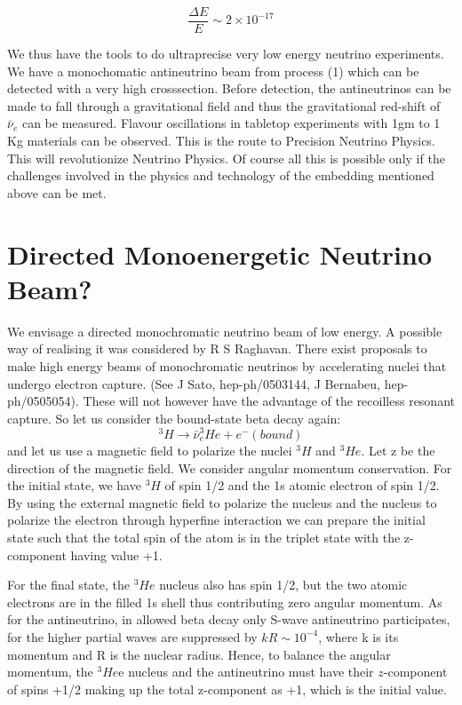 \begin{equation}
\frac{\Delta E}{E} \sim 2 \times 10^{-17}\label{eq-3}
\end{equation}


We thus have the tools to do ultraprecise very low energy neutrino experiments. We have
a monochomatic antineutrino beam from process (1) which can be detected with a very high
crosssection. Before detection, the antineutrinos can be made to fall through a gravitational
field and thus the gravitational red-shift of  $\bar{\nu}_{e}$ can be measured. Flavour oscillations in tabletop experiments with 1gm to 1 Kg materials can be observed. This is the route to Precision
Neutrino Physics. This will revolutionize Neutrino Physics. Of course all this is possible
only if the challenges involved in the physics and technology of the embedding mentioned
above can be met.

\section*{Directed Monoenergetic Neutrino Beam?}

We envisage a directed monochromatic neutrino beam of low energy. A possible way of
realising it was considered by R S Raghavan. There exist proposals to make high energy
beams of monochromatic neutrinos by accelerating nuclei that undergo electron capture.
(See J Sato, hep-ph/0503144, J Bernabeu, hep-ph/0505054). These will not however have
the advantage of the recoilless resonant capture. So let us consider the bound-state beta
decay again:
\begin{equation}
^{3}H \rightarrow \bar{\nu}_{e} ^{3}He + e^{-}(bound)\label{eq-4}
\end{equation}
and let us use a magnetic field to polarize the nuclei $^{3}H$ and $^{3}He$. Let z be the direction of
the magnetic field. We consider angular momentum conservation. For the initial state, we
have $^{3}H$ of spin 1/2 and the 1s atomic electron of spin 1/2. By using the external magnetic
field to polarize the nucleus and the nucleus to polarize the electron through hyperfine
interaction we can prepare the initial state such that the total spin of the atom is in the
triplet state with the z-component having value +1.

For the final state, the $^{3}He$ nucleus also has spin 1/2, but the two atomic electrons are
in the filled 1s shell thus contributing zero angular momentum. As for the antineutrino, in
allowed beta decay only S-wave antineutrino participates, for the higher partial waves are
suppressed by $kR \sim 10^{-4}$, where k is its momentum and R is the nuclear radius. Hence,
to balance the angular momentum, the $^{3}He$e nucleus and the antineutrino must have their
$z$-component of spins +1/2 making up the total z-component as +1, which is the initial
value.

